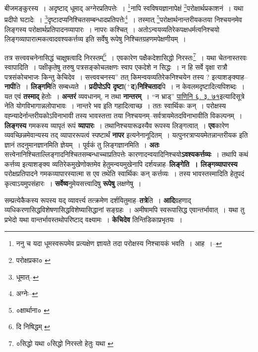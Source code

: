 \documentclass[article,12pt,a4paper]{memoir}
\newcommand{\add}[1]{($^{+}$#1)}
\begin{document}
	बीजमङ्कुरस्य । अदृष्टाद् धूमाद् अग्नेरप्रतिपत्तेः । \footnote{ननु च यदा धूमस्वरूपमेव प्रत्यक्षेण ज्ञायते तदा परोक्षस्य निश्चायकं भवति । आह ।--\cite{dp-msD-n}}नापि स्वविषयज्ञानापेक्षं \footnote{परोक्षप्रका० \cite{dp-msC}}परोक्षार्थप्रकाशनं । यथा प्रदीपो घटादेः । \footnote{धूमात्--\cite{dp-msD-n}}दृष्टादप्यनिश्चितसम्बन्धादप्रतिपत्तेः\footnote{अग्नेः--\cite{dp-msD-n}} । तस्मात् \footnote{०क्षार्थाना० \cite{dp-edE}}परोक्षार्थनान्तरीयकतया निश्चयनमेव लिङ्गस्य परोक्षार्थप्रतिपादनव्यापारः । नापरः कश्चित् । अतोऽन्वयव्यतिरेकपक्षधर्मत्वनिश्चयो लिङ्गव्यापारात्मकत्वादवश्यकर्त्तव्य इति सर्वेषु रूपेषु निश्चितग्रहणमपेक्षणीयम् । 
	  
	तत्र सत्त्ववचनेनासिद्धं चाक्षुषत्वादि निरस्तम्\footnote{दि निषिद्धम् \cite{dp-msB} \cite{dp-msD}} । एवकारेण पक्षैकदेशासिद्धो निरस्तः\footnote{०सिद्धो यथा \cite{dp-msA} \cite{dp-edN} \cite{dp-edP} ०सिद्धो निरस्तो हेतुः यथा \cite{dp-msB} \cite{dp-msD} \cite{dp-edE} \cite{dp-edH}} । यथा चेतनास्तरवः स्वापादिति । पक्षीकृतेषु तरुषु पत्रसङ्कोचलक्षणः स्वाप एकदेशे न सिद्धः । न हि सर्वे वृक्षा रात्रौ पत्रसंकोचभाजः किन्तु केचिदेव । सत्त्ववचनस्य” तत् किमन्वयव्यतिरेकनिश्चयेन तस्य ? इत्याशङ्क्याह--\textbf{नापी}ति । \textbf{लिङ्गमि}ति सम्बध्यते । \textbf{प्रदीपोऽपि दृष्टा\add{द}निश्चिताद}पि । न केवलमदृष्टादित्यपिशब्दः । यत एवं \textbf{तस्माद्} हेतोः । \textbf{अन्तरं} व्यवधानम्, न तथा \textbf{नान्तरम्} । “न भ्राड्” \href{http://http://sarit.indology.info/?cref=Pā.6.3.75}{पाणिनि ६. ३. ७१}इत्यादिसूत्रे नेति योगविभागान्नलोपाभावः । नान्तरे भव इति गहादित्वाच्छ । ततः स्वार्थिकः कन् । परोक्षस्य वह्न्यादेर्नान्तरीयकोऽविनाभावी तस्य भावस्तत्ता तया निश्चयनम्--सर्वत्रायमेतदविनाभावीति विकल्पनम् । \textbf{लिङ्गस्य} गमकस्य व्यापृतं रूपं \textbf{व्यापारः} । तथानिश्चयारूढस्यैव रूपस्य लिङ्गत्वात् । \textbf{एव}कारेण व्यवच्छिन्नमेवान्यस्य तद् व्यापाररूपत्वं स्पष्टार्थं \textbf{नापर} इत्यनेनानूदितम् । यत्पुनरत्राप्ययमेतन्नान्तरीयक इति ज्ञानं तदनुमानज्ञानमिति ज्ञेयम् । पूर्वकं तु लिङ्गज्ञानमिति । \textbf{अतः} सत्त्वेनानिश्चिताल्लिङ्गादनिश्चितसम्बन्धाच्चाप्रतिपत्तेः कारणादन्वयादिनिश्चयो\textbf{ऽवश्यकर्त्तव्यः} । तथापि कथं कर्त्तव्य इत्याशङ्क्य व्यतिरेकमुखेणोक्तमेव हेतुमन्वयमुखेनापि दर्शयन्नाह--\textbf{लिङ्गेति । लिङ्गव्यापारस्य} परोक्षप्रतिपादने गमकव्यापारस्यात्मा स एव तथेति स्वार्थिकः कन् कर्त्तव्यः । तस्य भावस्तस्मादिति हेतुपदं कृत्वाऽयमुपसंहारः । \textbf{सर्वेष्व}नुमेयसत्त्वादिषु \textbf{रूपेषु} लक्षणेषु । \leavevmode{}
	\pend
      

	  \pstart सम्प्रत्येकैकस्य रूपस्य यद् व्यावर्त्त्य तत्क्रमेण दर्शयितुमाह--\textbf{तत्रे}ति । \textbf{आदि}ग्रहणाद् व्यधिकरणासिद्धविशेषणासिद्धविशेष्यासिद्धानां सङ्ग्रहः । अमीषामपि स्वरूपासिद्ध एवान्तर्भावात् । यथा तु प्रभेदो यथा वान्तर्भावस्तथोपरिष्टाद् वक्ष्यामः । \textbf{केचिदेव} तिन्तिडिकाप्रभृतयः ।
	\pend
      
\end{document}
